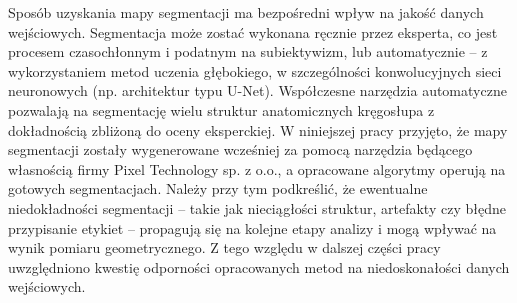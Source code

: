 Sposób uzyskania mapy segmentacji ma bezpośredni wpływ na jakość danych wejściowych.
Segmentacja może zostać wykonana ręcznie przez eksperta, co jest procesem czasochłonnym i podatnym na subiektywizm, lub automatycznie -- z wykorzystaniem metod uczenia głębokiego, w szczególności konwolucyjnych sieci neuronowych (np. architektur typu U-Net).
Współczesne narzędzia automatyczne pozwalają na segmentację wielu struktur anatomicznych kręgosłupa z dokładnością zbliżoną do oceny eksperckiej.
W niniejszej pracy przyjęto, że mapy segmentacji zostały wygenerowane wcześniej za pomocą narzędzia będącego własnością firmy Pixel Technology sp. z o.o., a opracowane algorytmy operują na gotowych segmentacjach.
Należy przy tym podkreślić, że ewentualne niedokładności segmentacji -- takie jak nieciągłości struktur, artefakty czy błędne przypisanie etykiet -- propagują się na kolejne etapy analizy i mogą wpływać na wynik pomiaru geometrycznego.
Z tego względu w dalszej części pracy uwzględniono kwestię odporności opracowanych metod na niedoskonałości danych wejściowych.